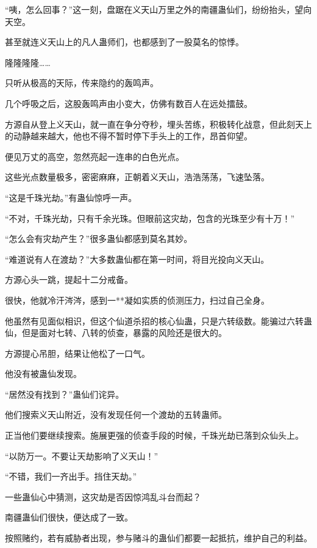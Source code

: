 
\begin{this_body}

“咦，怎么回事？”这一刻，盘踞在义天山万里之外的南疆蛊仙们，纷纷抬头，望向天空。

甚至就连义天山上的凡人蛊师们，也都感到了一股莫名的惊悸。

隆隆隆隆……

只听从极高的天际，传来隐约的轰鸣声。

几个呼吸之后，这股轰鸣声由小变大，仿佛有数百人在远处擂鼓。

方源自从登上义天山，就一直在争分夺秒，埋头苦练，积极转化战意，但此刻天上的动静越来越大，他也不得不暂时停下手头上的工作，昂首仰望。

便见万丈的高空，忽然亮起一连串的白色光点。

这些光点数量极多，密密麻麻，正朝着义天山，浩浩荡荡，飞速坠落。

“这是千珠光劫。”有蛊仙惊呼一声。

“不对，千珠光劫，只有千余光珠。但眼前这灾劫，包含的光珠至少有十万！”

“怎么会有灾劫产生？”很多蛊仙都感到莫名其妙。

“难道说有人在渡劫？”大多数蛊仙都在第一时间，将目光投向义天山。

方源心头一跳，提起十二分戒备。

很快，他就冷汗涔涔，感到一**凝如实质的侦测压力，扫过自己全身。

他虽然有见面似相识，但这个仙道杀招的核心仙蛊，只是六转级数。能骗过六转蛊仙，但是面对七转、八转的侦查，暴露的风险还是很大的。

方源提心吊胆，结果让他松了一口气。

他没有被蛊仙发现。

“居然没有找到？”蛊仙们诧异。

他们搜索义天山附近，没有发现任何一个渡劫的五转蛊师。

正当他们要继续搜索。施展更强的侦查手段的时候，千珠光劫已落到众仙头上。

“以防万一。不要让天劫影响了义天山！”

“不错，我们一齐出手。挡住天劫。”

一些蛊仙心中猜测，这灾劫是否因惊鸿乱斗台而起？

南疆蛊仙们很快，便达成了一致。

按照赌约，若有威胁者出现，参与赌斗的蛊仙们都要一起抵抗，维护自己的利益。


\end{this_body}
